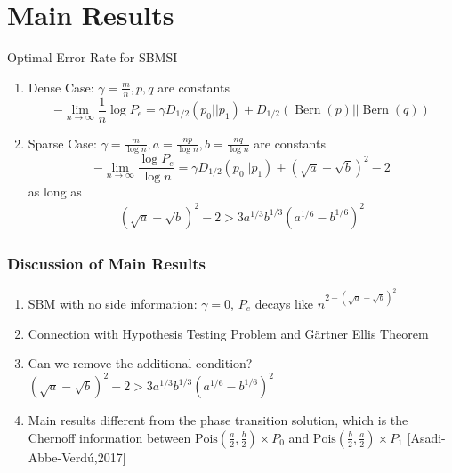 \documentclass{beamer}
\DeclareMathOperator{\Bern}{Bern}
\begin{document}
\section{Main Results}
\begin{frame}{Optimal Error Rate for SBMSI}
\begin{enumerate}
	\item Dense Case: $\gamma=\frac{m}{n}, p, q$ are constants
		\begin{equation*}
		-\lim_{n\to \infty} \frac{1}{n}\log P_e =  \gamma D_{1/2}(p_0 || p_1) + D_{1/2}(\Bern(p)||\Bern(q))
		\end{equation*}
	\item Sparse Case: $\gamma=\frac{m}{ \log n},
	a=\frac{np}{\log n}, b=\frac{nq}{\log n}$ are constants
		\begin{equation*}\label{eq:PeMainL}
		-\lim_{n\to \infty}\frac{\log P_e}{\log n}=\gamma D_{1/2}(p_0||p_1) + (\sqrt{a} - \sqrt{b})^2-2
		\end{equation*}
		as long as
		\begin{align*}
			(\sqrt{a}-\sqrt{b})^2-2 
			> 3a^{1/3}b^{1/3}(a^{1/6}-b^{1/6})^2\label{eq:oneC}
		\end{align*}	
\end{enumerate}
\end{frame}
\begin{frame}
\frametitle{Discussion of Main Results}
\begin{enumerate}
	\item SBM with no side information: $\gamma = 0$, $P_e$ decays like $n^{2-(\sqrt{a} - \sqrt{b})^2}$
	\item Connection with Hypothesis Testing Problem and Gärtner Ellis Theorem
	\item Can we remove the additional condition?
	$(\sqrt{a}-\sqrt{b})^2-2 
	> 3a^{1/3}b^{1/3}(a^{1/6}-b^{1/6})^2$
	\item Main results different from the phase transition solution,
	which is the Chernoff information
	between $\textrm{Pois}(\frac{a}{2},\frac{b}{2})\times P_0$ and $\textrm{Pois}(\frac{b}{2}, \frac{a}{2})\times P_1$
	[Asadi-Abbe-Verdú,2017]
\end{enumerate}

\end{frame}
\end{document}
